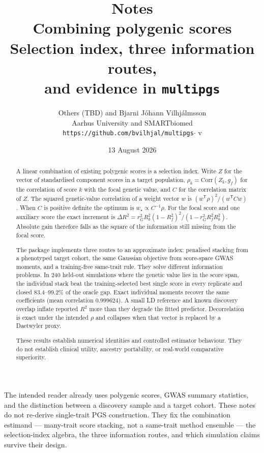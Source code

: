 \documentclass[11pt,a4paper]{article}
\title{%
  \vspace{-1.4em}
  {\large Notes}\\[0.4em]
  {\LARGE\bfseries Combining polygenic scores}\\[0.15em]
  {\large Selection index, three information routes,\\
   and evidence in \texttt{multipgs}}}
\author{Others (TBD) and Bjarni J\'ohann Vilhj\'almsson\\[0.35em]
  {\small Aarhus University and SMARTbiomed}\\[0.35em]
  {\small\texttt{https://github.com/bvilhjal/multipgs}\quad$\cdot$\quad
   v\ReportPackageVersion}}
\date{13 August 2026}
\newcommand{\Corr}{\mathrm{Corr}}
\newcommand{\Rtwo}{\(R^2\)}
\begin{document}
\maketitle
\thispagestyle{plain}

\begin{abstract}
\noindent
A linear combination of existing polygenic scores is a selection
index. Write \(Z\) for the vector of standardised component scores
in a target population, \(\rho_k=\Corr(Z_k,g_f)\) for the
correlation of score \(k\) with the focal genetic value, and \(C\)
for the correlation matrix of \(Z\). The squared genetic-value
correlation of a weight vector \(w\) is
\((w^{\mathsf T}\rho)^2/(w^{\mathsf T}Cw)\). When \(C\) is
positive definite the optimum is \(w_\star\propto C^{-1}\rho\).
For the focal score and one auxiliary score the exact increment is
\(\Delta R^2=r_G^2R_k^2(1-R_f^2)^2/(1-r_G^2R_f^2R_k^2)\). Absolute
gain therefore falls as the square of the information still
missing from the focal score.

The package implements three routes to an approximate index:
penalised stacking from a phenotyped target cohort, the same
Gaussian objective from score-space GWAS moments, and a
training-free same-trait rule. They solve different information
problems. In 240 held-out simulations where the genetic value
lies in the score span, the individual stack beat the
training-selected best single score in every replicate and closed
83.4--99.2\% of the oracle gap. Exact individual moments recover
the same coefficients (mean correlation \(0.999624\)). A small LD
reference and known discovery overlap inflate reported \Rtwo{}
more than they degrade the fitted predictor. Decorrelation is
exact under the intended \(\rho\) and collapses when that vector
is replaced by a Daetwyler proxy.

These results establish numerical identities and controlled
estimator behaviour. They do not establish clinical utility,
ancestry portability, or real-world comparative superiority.
\end{abstract}

\vspace{0.4em}
\noindent
The intended reader already uses polygenic scores, GWAS summary
statistics, and the distinction between a discovery sample and a
target cohort. These notes do not re-derive single-trait PGS
construction. They fix the combination estimand --- many-trait
score stacking, not a same-trait method ensemble --- the
selection-index algebra, the three information routes, and which
simulation claims survive their design.
\end{document}
